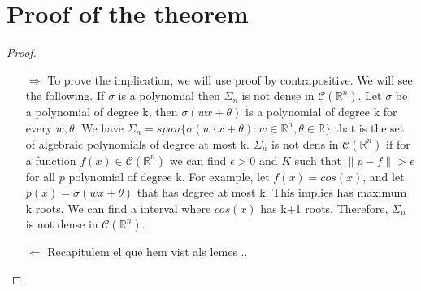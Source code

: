 \documentclass[../main.tex]{subfiles}
\begin{document}
\section{Proof of the theorem}
	\begin{proof}~ %

	\begin{enumerate}
		\item[$\Rightarrow$] To prove the implication, we will use proof by contrapositive. We will see the following. If $\sigma$ is a polynomial then $\Sigma_n$ is not dense in $\mathcal{C}(\mathbb{R}^n)$. Let $\sigma$ be a polynomial of degree k, then $\sigma(wx+\theta)$ is a polynomial  of degree k for every $w,\theta$. We have $ \Sigma_n = span\{\sigma(w\cdot x + \theta) : w\in \mathbb{R}^n, \theta \in \mathbb{R} \}$ that is the set of algebraic polynomials of degree at most k. $\Sigma_n$ is not dens in $\mathcal{C}(\mathbb{R}^n)$ if for a function $f(x)\in \mathcal{C}(\mathbb{R}^n)$ we can find $\epsilon > 0$ and $K$ such that  $\| p-f \| > \epsilon$ for all $p$ polynomial of degree k. For example, let $f(x)=cos(x)$, and let $p(x)= \sigma(wx+\theta)$ that has degree at most k. This implies has maximum k roots. We can find a interval where $cos(x)$ has k+1 roots. Therefore, $\Sigma_n$ is not dense in $\mathcal{C}(\mathbb{R}^n)$. 

		\item[$\Leftarrow$]  Recapitulem el que hem vist als lemes ..
	\end{enumerate}
\end{proof}
	\cite{leshno1993multilayer}
\end{document}
